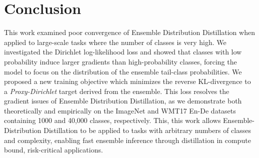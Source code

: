 \section{Conclusion}\label{sec:conclusion}

This work examined poor convergence of Ensemble Distribution Distillation when applied to large-scale tasks where the number of classes is very high. We investigated the Dirichlet log-likelihood loss and showed that classes with low probability induce larger gradients than high-probability classes, forcing the model to focus on the distribution of the ensemble tail-class probabilities. We proposed a new training objective which minimizes the reverse KL-divergence to a \emph{Proxy-Dirichlet} target derived from the ensemble. This loss resolves the gradient issues of Ensemble Distribution Distillation, as we demonstrate both theoretically and empirically on the ImageNet and WMT17 En-De datasets containing 1000 and 40,000 classes, respectively. This, this work allows Ensemble-Distribution Distillation to be applied to tasks with arbitrary numbers of classes and complexity, enabling fast ensemble inference through distillation in compute bound, risk-critical applications.

